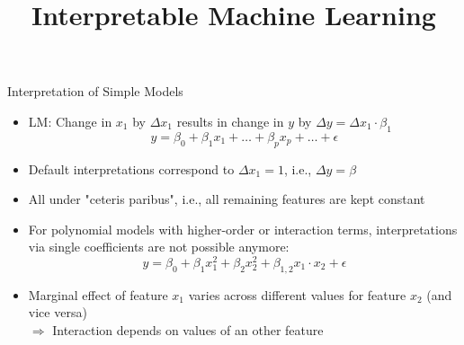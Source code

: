 \documentclass[11pt,compress,t,notes=noshow, aspectratio=169, xcolor=table]{beamer}
\title{Interpretable Machine Learning}
\date{}
\begin{document}
\newcommand{\titlefigure}{figure_man/me_movement}
\newcommand{\learninggoals}{
\item Why parameter-based interpretations are not always possible for parametric models
\item How marginal effects can be used in such cases
\item Drawbacks of marginal effects
\item Model-agnostic applicability}


\begin{frame}{Interpretation of Simple Models}

\begin{itemize}
\itemsep1em
\item LM: Change in $x_1$ by $\Delta x_1$ results in change in $y$ by $\Delta y = \Delta x_1 \cdot \beta_1$
\begin{equation*}
y = \beta_0 + \beta_1 x_1 + \dots + \beta_p x_p + \dots + \epsilon
\end{equation*}
\item Default interpretations correspond to $\Delta x_1 = 1$, i.e., $\Delta y = \beta$
\item All under "ceteris paribus", i.e., all remaining features are kept constant
\item For polynomial models with higher-order or interaction terms, interpretations via single coefficients are not possible anymore:
\begin{equation}
y = \beta_0 + \beta_{1} x_1^2 + \beta_{2} x_2^2 + \beta_{1, 2} x_1 \cdot x_2 + \epsilon
\label{eq:poly_model}
\end{equation}
\item Marginal effect of feature $x_1$ varies across different values for feature $x_2$ (and vice versa)\\
$\Rightarrow$ Interaction depends on values of an other feature
\end{itemize}
\end{frame}

\end{document}

